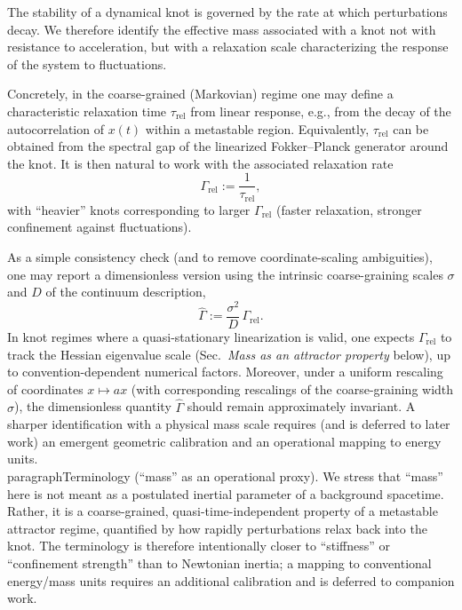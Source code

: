 \documentclass[reprint,amsmath,amssymb,aps,prd,nofootinbib,floatfix]{revtex4-2}
\begin{document}
The stability of a dynamical knot is governed by the rate at which perturbations decay.
We therefore identify the effective mass associated with a knot not with resistance to acceleration, but with a relaxation scale characterizing the response of the system to fluctuations.

Concretely, in the coarse-grained (Markovian) regime one may define a characteristic relaxation time $\tau_{\mathrm{rel}}$ from linear response, e.g., from the decay of the autocorrelation of $x(t)$ within a metastable region.
Equivalently, $\tau_{\mathrm{rel}}$ can be obtained from the spectral gap of the linearized Fokker--Planck generator around the knot.
It is then natural to work with the associated relaxation rate
\begin{equation}
\Gamma_{\mathrm{rel}} := \frac{1}{\tau_{\mathrm{rel}}},
\end{equation}
with ``heavier'' knots corresponding to larger $\Gamma_{\mathrm{rel}}$ (faster relaxation, stronger confinement against fluctuations).

As a simple consistency check (and to remove coordinate-scaling ambiguities), one may report a dimensionless version using the intrinsic coarse-graining scales $\sigma$ and $D$ of the continuum description,
\begin{equation}
\widehat{\Gamma} := \frac{\sigma^2}{D}\,\Gamma_{\mathrm{rel}}.
\end{equation}
In knot regimes where a quasi-stationary linearization is valid, one expects $\Gamma_{\mathrm{rel}}$ to track the Hessian eigenvalue scale (Sec.~\emph{Mass as an attractor property} below), up to convention-dependent numerical factors.
Moreover, under a uniform rescaling of coordinates $x\mapsto a x$ (with corresponding rescalings of the coarse-graining width $\sigma$), the dimensionless quantity $\widehat{\Gamma}$ should remain approximately invariant.
A sharper identification with a physical mass scale requires (and is deferred to later work) an emergent geometric calibration and an operational mapping to energy units.
\\paragraph{Terminology (``mass'' as an operational proxy).} We stress that ``mass'' here is not meant as a postulated inertial parameter of a background spacetime. Rather, it is a coarse-grained, quasi-time-independent property of a metastable attractor regime, quantified by how rapidly perturbations relax back into the knot. The terminology is therefore intentionally closer to ``stiffness'' or ``confinement strength'' than to Newtonian inertia; a mapping to conventional energy/mass units requires an additional calibration and is deferred to companion work.
\end{document}
